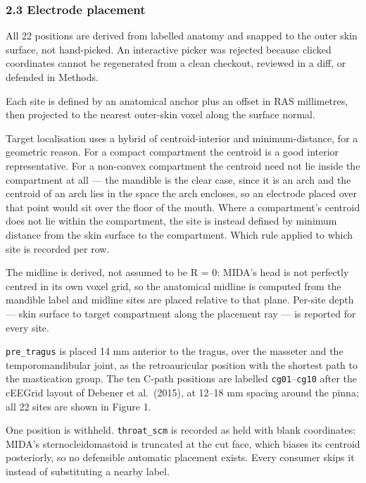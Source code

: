 \documentclass[
  11pt,
  letterpaper,
]{article}
\begin{document}
\subsubsection{2.3 Electrode placement}\label{electrode-placement}

All 22 positions are derived from labelled anatomy and snapped to the outer skin
surface, not hand-picked. An interactive picker was rejected because clicked
coordinates cannot be regenerated from a clean checkout, reviewed in a diff, or
defended in Methods.

Each site is defined by an anatomical anchor plus an offset in RAS millimetres,
then projected to the nearest outer-skin voxel along the surface normal.

Target localisation uses a hybrid of centroid-interior and minimum-distance, for
a geometric reason. For a compact compartment the centroid is a good interior
representative. For a non-convex compartment the centroid need not lie inside
the compartment at all --- the mandible is the clear case, since it is an arch and
the centroid of an arch lies in the space the arch encloses, so an electrode
placed over that point would sit over the floor of the mouth. Where a
compartment's centroid does not lie within the compartment, the site is instead
defined by minimum distance from the skin surface to the compartment. Which rule
applied to which site is recorded per row.

The midline is derived, not assumed to be R = 0: MIDA's head is not perfectly
centred in its own voxel grid, so the anatomical midline is computed from the
mandible label and midline sites are placed relative to that plane. Per-site
depth --- skin surface to target compartment along the placement ray --- is reported
for every site.

\texttt{pre\_tragus} is placed 14 mm anterior to the tragus, over the masseter and the
temporomandibular joint, as the retroauricular position with the shortest path
to the mastication group. The ten C-path positions are labelled \texttt{cg01}--\texttt{cg10}
after the cEEGrid layout of Debener et al.~(2015), at 12--18 mm spacing around
the pinna; all 22 sites are shown in Figure 1.

One position is withheld. \texttt{throat\_scm} is recorded as held with blank
coordinates: MIDA's sternocleidomastoid is truncated at the cut face, which
biases its centroid posteriorly, so no defensible automatic placement exists.
Every consumer skips it instead of substituting a nearby label.
\end{document}
